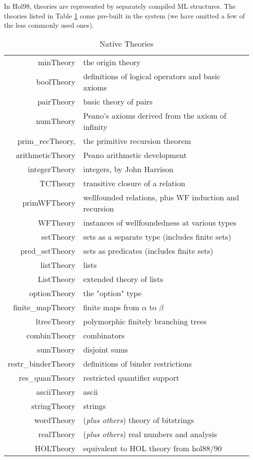 \documentclass[12pt,fleqn,layout,a4paper]{report}
\begin{document}
In Hol98, theories are represented by separately compiled ML
structures. The theories listed in Table \ref{nativeTheories} come
pre-built in the system (we have omitted a few of the less commonly used
ones).
\begin{table}
\begin{center}
\begin{tabular}{|r|l|} \hline
minTheory & the origin theory \\
boolTheory & definitions of logical operators and basic axioms \\
pairTheory & basic theory of pairs \\
numTheory & Peano's axioms derived from the axiom of infinity \\
prim\_recTheory, & the primitive recursion theorem \\
arithmeticTheory & Peano arithmetic development \\
integerTheory & integers, by John Harrison \\
TCTheory & transitive closure of a relation \\
primWFTheory & wellfounded relations, plus WF induction and recursion \\
WFTheory & instances of wellfoundedness at various types \\
setTheory & sets as a separate type (includes finite sets) \\
pred\_setTheory & sets as predicates (includes finite sets) \\
listTheory & lists  \\
ListTheory & extended theory of lists \\
optionTheory & the "option" type \\
finite\_mapTheory & finite maps from $\alpha$ to $\beta$ \\
ltreeTheory & polymorphic finitely branching trees \\
combinTheory & combinators \\
sumTheory & disjoint sums \\
restr\_binderTheory & definitions of binder restrictions \\
res\_quanTheory & restricted quantifier support \\
asciiTheory & ascii \\
stringTheory & strings \\
wordTheory & ({\it plus others}) theory of bitstrings \\
realTheory & ({\it plus others}) real numbers and analysis \\
HOLTheory & equivalent to HOL theory from hol88/90\\  \hline
\end{tabular}
\caption{Native Theories}\label{nativeTheories}
\end{center}
\end{table}
\end{document}
